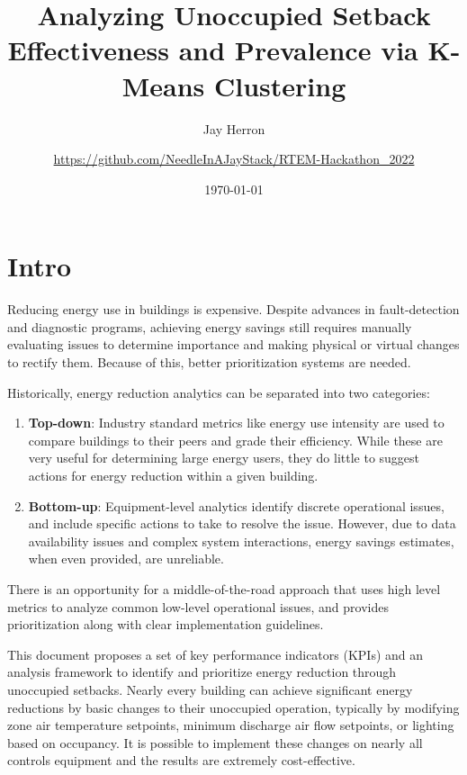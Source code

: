 \documentclass[a4paper]{article}
\begin{document}
\title{Analyzing Unoccupied Setback Effectiveness and Prevalence via K-Means Clustering}
\author{
	Jay Herron
	\and
	\url{https://github.com/NeedleInAJayStack/RTEM-Hackathon\_2022}
}
\date{\today}
\maketitle

\section{Intro}

Reducing energy use in buildings is expensive. Despite advances in fault-detection and diagnostic programs, achieving energy savings still requires manually evaluating issues to determine importance and making physical or virtual changes to rectify them. Because of this, better prioritization systems are needed.

Historically, energy reduction analytics can be separated into two categories:
\begin{enumerate}
\item{\textbf{Top-down}: Industry standard metrics like energy use intensity are used to compare buildings to their peers and grade their efficiency. While these are very useful for determining large energy users, they do little to suggest actions for energy reduction within a given building.}
\item{\textbf{Bottom-up}: Equipment-level analytics identify discrete operational issues, and include specific actions to take to resolve the issue. However, due to data availability issues and complex system interactions, energy savings estimates, when even provided, are unreliable.}
\end{enumerate}

There is an opportunity for a middle-of-the-road approach that uses high level metrics to analyze common low-level operational issues, and provides prioritization along with clear implementation guidelines.

This document proposes a set of key performance indicators (KPIs) and an analysis framework to identify and prioritize energy reduction through unoccupied setbacks. Nearly every building can achieve significant energy reductions by basic changes to their unoccupied operation, typically by modifying zone air temperature setpoints, minimum discharge air flow setpoints, or lighting based on occupancy. It is possible to implement these changes on nearly all controls equipment and the results are extremely cost-effective.
\end{document}
